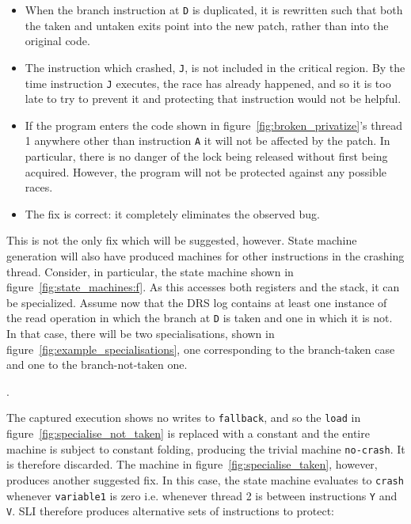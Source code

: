\documentclass[10pt,twocolumn,preprint,natbib,authoryear]{sigplanconf}
\begin{document}
\begin{itemize}
\item When the branch instruction at \verb|D| is duplicated, it is
  rewritten such that both the taken and untaken exits point into the
  new patch, rather than into the original code.
\item The instruction which crashed, \verb|J|, is not included in the
  critical region.  By the time instruction \verb|J| executes, the
  race has already happened, and so it is too late to try to prevent
  it and protecting that instruction would not be helpful.
\item If the program enters the code shown in
  figure~\ref{fig:broken_privatize}'s thread 1 anywhere other than
  instruction \verb|A| it will not be affected by the patch.  In
  particular, there is no danger of the lock being released without
  first being acquired.  However, the program will not be protected
  against any possible races.
\item The fix is correct: it completely eliminates the observed bug.
\end{itemize}

This is not the only fix which will be suggested, however.  State
machine generation will also have produced machines for other
instructions in the crashing thread.  Consider, in particular, the
state machine shown in figure~\ref{fig:state_machines:f}.  As this
accesses both registers and the stack, it can be specialized.  Assume
now that the DRS log contains at least one instance of the read
operation in which the branch at \verb|D| is taken and one in which it
is not.  In that case, there will be two specialisations, shown in
figure~\ref{fig:example_specialisations}, one corresponding to the
branch-taken case and one to the branch-not-taken one.

\begin{figure*}[thb]
\caption{Results of specialising figure~\ref{fig:state_machines:f}}
\label{fig:example_specialisations}
\end{figure*}.

The captured execution shows no writes to \verb|fallback|, and so the
\verb|load| in figure~\ref{fig:specialise_not_taken} is replaced with
a constant and the entire machine is subject to constant folding,
producing the trivial machine \verb|no-crash|.  It is therefore
discarded.  The machine in figure~\ref{fig:specialise_taken}, however,
produces another suggested fix.  In this case, the state machine
evaluates to \verb|crash| whenever \verb|variable1| is zero
i.e. whenever thread 2 is between instructions \verb|Y| and \verb|V|.
SLI therefore produces alternative sets of instructions to protect:
\end{document}
